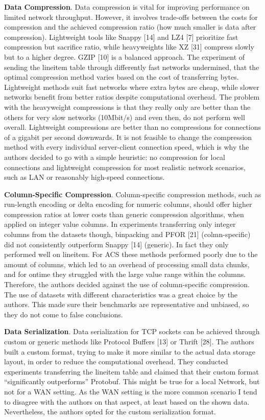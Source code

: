 \documentclass[sigconf]{acmart}
\begin{document}
\textbf{Data Compression}.
Data compression is vital for improving performance on limited network throughput. However, it involves trade-offs between the costs for compression and the achieved compression ratio (how much smaller is data after compression). Lightweight tools like Snappy [14] and LZ4 [7] prioritize fast compression but sacrifice ratio, while heavyweights like XZ [31] compress slowly but to a higher degree. GZIP [10] is a balanced approach.
The experiment of sending the lineitem table through differently fast networks undermined, that the optimal compression method varies based on the cost of transferring bytes. Lightweight methods suit fast networks where extra bytes are cheap, while slower networks benefit from better ratios despite computational overhead. The problem with the heavyweight compressions is that they really only are better than the others for very slow networks (10Mbit/s) and even then, do not perform well overall. Lightweight compressions are better than no compressions for connections of a gigabit per second downwards.
It is not feasible to change the compression method with every individual server-client connection speed, which is why the authors decided to go with a simple heuristic: no compression for local connections and lightweight compression for most realistic network scenarios, such as LAN or reasonably high-speed connections.

\textbf{Column-Specific Compression}.
Column-specific compression methods, such as run-length encoding or delta encoding for numeric columns, should offer higher compression ratios at lower costs than generic compression algorithms, when applied on integer value columns. In experiments transferring only integer columns from the datasets though, binpacking and PFOR [21] (colmn-specific) did not consistently outperform Snappy [14] (generic). In fact they only performed well on lineitem. For ACS these methods performed poorly due to the amount of columns, which led to an overhead of processing small data chunks, and for ontime they struggled with the large value range within the columns. Therefore, the authors decided against the use of column-specific compression. 
The use of datasets with different characteristics was a great choice by the authors. This made sure their benchmarks are representative and unbiased, so they do not come to false conclusions.

\textbf{Data Serialization}.
Data serialization for TCP sockets can be achieved through custom or generic methods like Protocol Buffers [13] or Thrift [28]. The authors built a custom format, trying to make it more similar to the actual data storage layout, in order to reduce the computational overhead.
They conducted experiments transferring the lineitem table and claimed that their custom format “significantly outperforms” Protobuf. This might be true for a local Network, but not for a WAN setting. As the WAN setting is the more common scenario I tend to disagree with the authors on that aspect, at least based on the shown data. Nevertheless, the authors opted for the custom serialization format.
\end{document}
